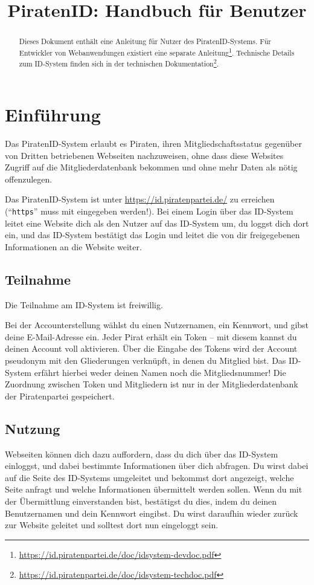 

\title{PiratenID: Handbuch für Benutzer}


\maketitle

\begin{abstract}\noindent
Dieses Dokument enthält eine Anleitung für Nutzer des PiratenID-Systems.
Für Entwickler von Webanwendungen existiert eine separate Anleitung\footnote{\url{https://id.piratenpartei.de/doc/idsystem-devdoc.pdf}}.
Technische Details zum ID-System finden sich in der technischen Dokumentation\footnote{\url{https://id.piratenpartei.de/doc/idsystem-techdoc.pdf}}.
\end{abstract}


\section{Einführung}
Das PiratenID-System erlaubt es Piraten, ihren Mitgliedschaftsstatus gegenüber von Dritten betriebenen Webseiten nachzuweisen,
ohne dass diese Websites Zugriff auf die Mitgliederdatenbank bekommen und ohne mehr Daten als nötig offenzulegen.

Das PiratenID-System ist unter \url{https://id.piratenpartei.de/} zu erreichen ("`\texttt{https}"' muss mit eingegeben werden!).
Bei einem Login über das ID-System leitet eine Website dich als den Nutzer auf das ID-System um, du loggst dich dort ein,
und das ID-System bestätigt das Login und leitet die von dir freigegebenen Informationen an die Website weiter.

\subsection{Teilnahme}
Die Teilnahme am ID-System ist freiwillig.

Bei der Accounterstellung wählst du einen Nutzernamen, ein Kennwort, und gibst deine E-Mail-Adresse ein.
Jeder Pirat erhält ein Token -- mit diesem kannst du deinen Account voll aktivieren.
Über die Eingabe des Tokens wird der Account pseudonym mit den Gliederungen verknüpft, in denen du Mitglied bist.
Das ID-System erfährt hierbei weder deinen Namen noch die Mitgliedsnummer!
Die Zuordnung zwischen Token und Mitgliedern ist nur in der Mitgliederdatenbank der Piratenpartei gespeichert.

\subsection{Nutzung}
Webseiten können dich dazu auffordern, dass du dich über das ID-System einloggst, und dabei bestimmte Informationen über dich abfragen.
Du wirst dabei auf die Seite des ID-Systems umgeleitet und bekommst dort angezeigt, welche Seite anfragt und welche Informationen übermittelt werden sollen.
Wenn du mit der Übermittlung einverstanden bist, bestätigst du dies, indem du deinen Benutzernamen und dein Kennwort eingibst.
Du wirst daraufhin wieder zurück zur Website geleitet und solltest dort nun eingeloggt sein.

